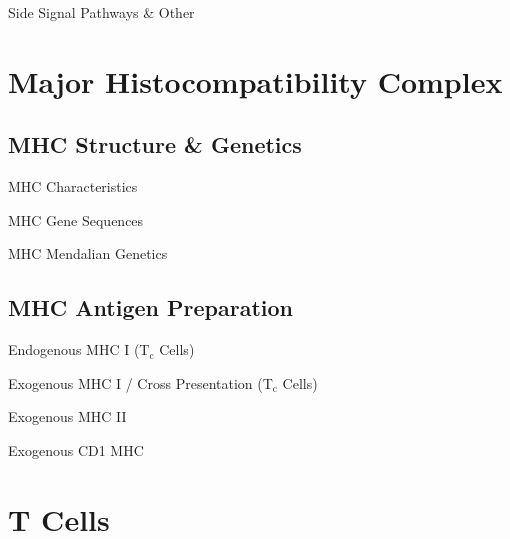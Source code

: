 \documentclass[10pt]{article}
\begin{document}
    \begin{core}{Side Signal Pathways \& Other}

    \end{core}

\section{Major Histocompatibility Complex}

  \subsection{MHC Structure \& Genetics}

    \begin{core}{MHC Characteristics}

    \end{core}

    \begin{core}{MHC Gene Sequences}

    \end{core}
    
    \begin{core}{MHC Mendalian Genetics}

    \end{core}

  \subsection{MHC Antigen Preparation}

    \begin{core}{Endogenous MHC I (T$_{\text{c}}$ Cells)}

    \end{core}

    \begin{core}{Exogenous MHC I / Cross Presentation (T$_{\text{c}}$ Cells)}

    \end{core}

    \begin{core}{Exogenous MHC II}

    \end{core}

    \begin{core}{Exogenous CD1 MHC}

    \end{core}
 
\section{T Cells}
\end{document}
